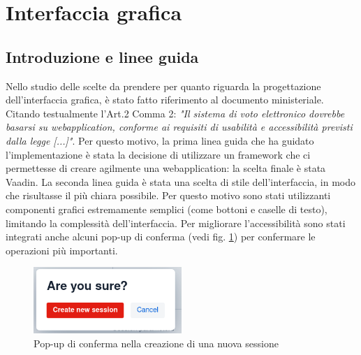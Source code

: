 \section{Interfaccia grafica}\label{gui}

\subsection{Introduzione e linee guida}
Nello studio delle scelte da prendere per quanto riguarda la progettazione dell'interfaccia grafica, è stato fatto riferimento al documento ministeriale. Citando testualmente l'Art.2 Comma 2: \emph{"Il sistema di voto elettronico dovrebbe basarsi su webapplication, conforme ai requisiti di usabilità e accessibilità previsti dalla legge [...]"}. 
Per questo motivo, la prima linea guida che ha guidato l'implementazione è stata la decisione di utilizzare un framework che ci permettesse di creare agilmente una webapplication: la scelta finale è stata Vaadin.
La seconda linea guida è stata una scelta di stile dell'interfaccia, in modo che risultasse il più chiara possibile. Per questo motivo sono stati utilizzanti componenti grafici estremamente semplici (come bottoni e caselle di testo), limitando la complessità dell'interfaccia.
Per migliorare l'accessibilità sono stati integrati anche alcuni pop-up di conferma (vedi fig. \ref{screeenshot:newsessionconfirm}) per confermare le operazioni più importanti.
\begin{figure}
	\centering
	\includegraphics[width=0.5\textwidth]{img/gui/newSessionConfirm.png}
	\caption{Pop-up di conferma nella creazione di una nuova sessione}
	\label{screeenshot:newsessionconfirm}
\end{figure}

